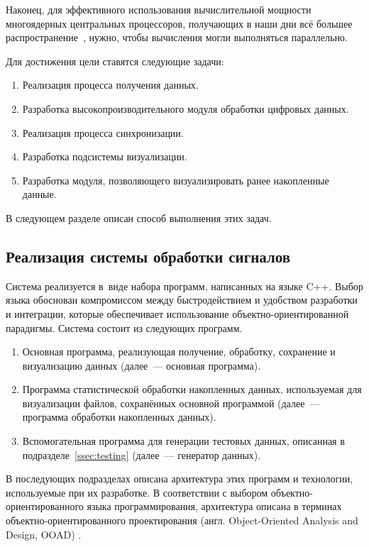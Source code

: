 \documentclass[a4paper, 14pt, titlepage]{extarticle}
\newcommand{\eng}[1]{\foreignlanguage{english}{#1}}
\begin{document}
  Наконец, для эффективного использования вычислительной мощности многоядерных центральных
  процессоров, получающих в наши дни всё большее распространение~\cite{steam-hardware}, нужно, чтобы
  вычисления могли выполняться параллельно.

  Для достижения цели ставятся следующие задачи:
  \begin{enumerate}
    \item Реализация процесса получения данных.
    \item Разработка высокопроизводительного модуля обработки цифровых данных.
    \item Реализация процесса синхронизации.
    \item Разработка подсистемы визуализации.
    \item Разработка модуля, позволяющего визуализировать ранее накопленные данные.
  \end{enumerate}

  В следующем разделе описан способ выполнения этих задач.

  \subsection{Реализация системы обработки сигналов}\label{ssec:impl}

  Система реализуется в~виде набора программ, написанных на языке C++. Выбор языка обоснован
  компромиссом между быстродействием и удобством разработки и интеграции, которые обеспечивает
  использование объектно-ориентированной парадигмы. Система состоит из следующих программ.

  \begin{enumerate}
    \item Основная программа, реализующая получение, обработку, сохранение и визуализацию данных
      (далее~--- основная программа).
    \item Программа статистической обработки накопленных данных, используемая для визуализации
      файлов, сохранённых основной программой (далее~--- программа обработки накопленных данных).
    \item Вспомогательная программа для генерации тестовых данных, описанная в подразделе~\ref{ssec:testing}
      (далее~--- генератор данных).
  \end{enumerate}

  В последующих подразделах описана архитектура этих программ и технологии, используемые при их
  разработке. В соответствии с выбором объектно-ориентированного языка программирования, архитектура описана в
  терминах объектно-ориентированного проектирования (англ. \eng{Object-Oriented Analysis and Design,
  OOAD}) \cite{booch-ooad}.
\end{document}
